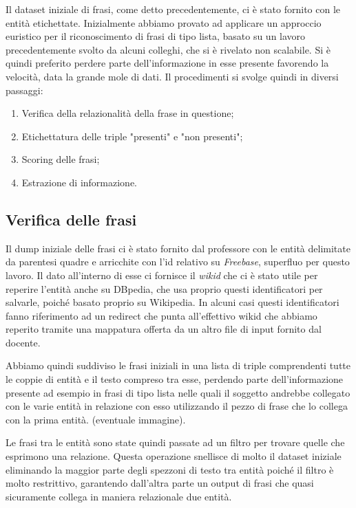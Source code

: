 \documentclass[10pt,a4paper,twocolumn]{article}
\begin{document}
Il dataset iniziale di frasi, come detto precedentemente, ci è stato fornito con le entità etichettate. Inizialmente abbiamo provato ad applicare un approccio euristico per il riconoscimento di frasi di tipo lista, basato su un lavoro precedentemente svolto da alcuni colleghi, che si è rivelato non scalabile. Si è quindi preferito perdere parte dell'informazione in esse presente favorendo la velocità, data la grande mole di dati.
Il procedimenti si svolge quindi in diversi passaggi:
\begin{enumerate}
\item Verifica della relazionalità della frase in questione;
\item Etichettatura delle triple "presenti" e "non presenti";
\item Scoring delle frasi;
\item Estrazione di informazione.
\end{enumerate}

\subsection{Verifica delle frasi}
Il dump iniziale delle frasi ci è stato fornito dal professore con le entità delimitate da parentesi quadre e arricchite con l'id relativo su \textit{Freebase}, superfluo per questo lavoro. Il dato all'interno di esse ci fornisce il \textit{wikid} che ci è stato utile per reperire l'entità anche su DBpedia, che usa proprio questi identificatori per salvarle, poiché basato proprio su Wikipedia. In alcuni casi questi identificatori fanno riferimento ad un redirect che punta all'effettivo wikid che abbiamo reperito tramite una mappatura offerta da un altro file di input fornito dal docente.

Abbiamo quindi suddiviso le frasi iniziali in una lista di triple comprendenti tutte le coppie di entità e il testo compreso tra esse, perdendo parte dell'informazione presente ad esempio in frasi di tipo lista nelle quali il soggetto andrebbe collegato con le varie entità in relazione con esso utilizzando il pezzo di frase che lo collega con la prima entità. (eventuale immagine).

Le frasi tra le entità sono state quindi passate ad un filtro per trovare quelle che esprimono una relazione. Questa operazione snellisce di molto il dataset iniziale eliminando la maggior parte degli spezzoni di testo tra entità poiché il filtro è molto restrittivo, garantendo dall'altra parte un output di frasi che quasi sicuramente collega in maniera relazionale due entità.
\end{document}

